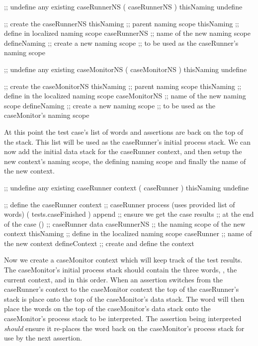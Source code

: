 \startJoylolCode
    ;; undefine any existing caseRunnerNS
    ( caseRunnerNS )
    thisNaming
    undefine

    ;; create the caseRunnerNS
    thisNaming   ;; parent naming scope
    thisNaming   ;; define in localized naming scope
    caseRunnerNS ;; name of the new naming scope
    defineNaming ;; create a new naming scope
                 ;; to be used as the caseRunner's naming scope
\stopJoylolCode

\startJoylolCode
    ;; undefine any existing caseMonitorNS
    ( caseMonitorNS )
    thisNaming
    undefine

    ;; create the caseMonitorNS
    thisNaming    ;; parent naming scope
    thisNaming    ;; define in the localized naming scope
    caseMonitorNS ;; name of the new naming scope
    defineNaming  ;; create a new naming scope
                  ;; to be used as the caseMonitor's naming scope
\stopJoylolCode

At this point the test case's list of words and assertions are back on the 
top of the stack. This list will be used as the caseRunner's initial 
process stack. We can now add the initial data stack for the caseRunner 
context, and then setup the new context's naming scope, the defining 
naming scope and finally the name of the new context.

\startJoylolCode
    ;; undefine any existing caseRunner context
    ( caseRunner )
    thisNaming
    undefine

    ;; define the caseRunner context
                  ;; caseRunner process (uses provided list of words)
    ( tests.caseFinished )
    append        ;; ensure we get the case results
                  ;; at the end of the case
    ()            ;; caseRunner data
    caseRunnerNS  ;; the naming scope of the new context
    thisNaming    ;; define in the localized naming scope
    caseRunner    ;; name of the new context
    defineContext ;; create and define the context
\stopJoylolCode

Now we create a caseMonitor context which will keep track of the test 
results. The caseMonitor's initial process stack should contain the three 
words, , the current context, and  in this 
order. When an assertion switches from the caseRunner's context to the 
caseMonitor context the top of the caseRunner's stack is place onto the 
top of the caseMonitor's data stack. The  word will then 
place the words on the top of the caseMonitor's data stack onto the 
caseMonitor's process stack to be interpreted. The assertion being 
interpreted \emph{should} ensure it re-places the  word 
back on the caseMonitor's process stack for use by the next assertion. 

